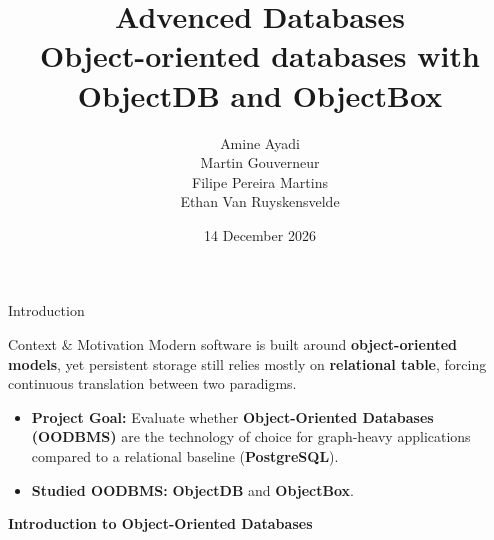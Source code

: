 \documentclass{beamer}
\title{Advenced Databases\\Object-oriented databases with ObjectDB
and ObjectBox}
\date{14 December 2026}
\author[]{
    Amine Ayadi\texorpdfstring{\\}{, }
    Martin Gouverneur\texorpdfstring{\\}{, }
    Filipe Pereira Martins\texorpdfstring{\\}{, }
    Ethan Van Ruyskensvelde
}
\institute[]
{
    Université Libre de Bruxelles
}
\begin{document}
\begin{frame}
    \titlepage
\end{frame}

\begin{frame}{Introduction}
    \begin{block}{Context \& Motivation}
        Modern software is built around \textbf{object-oriented models}, yet persistent storage still relies mostly on \textbf{relational table}, forcing continuous translation between two paradigms.
    \end{block}

    \vspace{0.5em}
    \begin{itemize}
        \item \textbf{Project Goal:} Evaluate whether \textbf{Object-Oriented Databases (OODBMS)} are the technology of choice for graph-heavy applications compared to a relational baseline (\textbf{PostgreSQL}).
        \item     \textbf{Studied OODBMS:} \textbf{ObjectDB} and \textbf{ObjectBox}.

    \end{itemize}
\end{frame}

\begin{frame}
    \vfill
    \begin{center}
        {\LARGE \textbf{Introduction to Object-Oriented Databases}}\\[0.8em]
    \end{center}
    \vfill
\end{frame}

\end{document}
